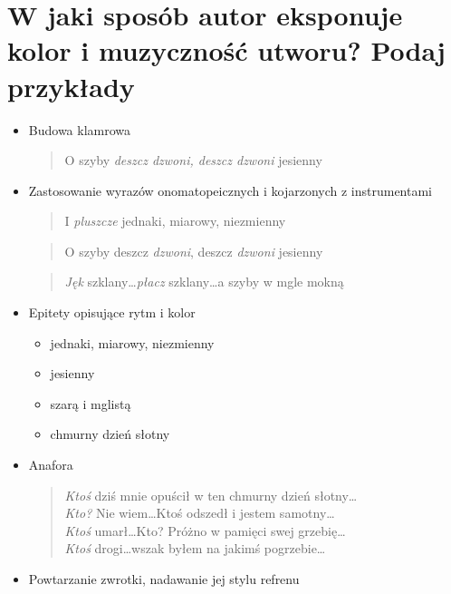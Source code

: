 \documentclass{article}
\begin{document}
\section{W jaki sposób autor eksponuje kolor i muzyczność utworu? Podaj przykłady}
\begin{itemize}
        \item Budowa klamrowa
        \begin{quote}
                O szyby \emph{deszcz dzwoni, deszcz dzwoni} jesienny
        \end{quote}
        \item Zastosowanie wyrazów onomatopeicznych i kojarzonych z instrumentami
        \begin{quote}
                I \emph{pluszcze} jednaki, miarowy, niezmienny
        \end{quote}
        \begin{quote}
                O szyby deszcz \emph{dzwoni}, deszcz \emph{dzwoni} jesienny
        \end{quote}
        \begin{quote}
                \emph{Jęk} szklany\dots \emph{płacz} szklany\dots a szyby w mgle mokną
        \end{quote}
        \item Epitety opisujące rytm i kolor
        \begin{itemize}
                \item jednaki, miarowy, niezmienny
                \item jesienny
                \item szarą i mglistą
                \item chmurny dzień słotny
        \end{itemize}
        \pagebreak
        \item Anafora
        \begin{quote}
                \emph{Ktoś} dziś mnie opuścił w ten chmurny dzień słotny\dots \\
                \emph{Kto?} Nie wiem\dots Ktoś odszedł i jestem samotny\dots \\
                \emph{Ktoś} umarł\dots Kto? Próżno w pamięci swej grzebię\dots \\
                \emph{Ktoś} drogi\dots wszak byłem na jakimś pogrzebie\dots
        \end{quote}
        \item Powtarzanie zwrotki, nadawanie jej stylu refrenu
        \begin{quote}

\end{quote}
\end{itemize}
\end{document}
